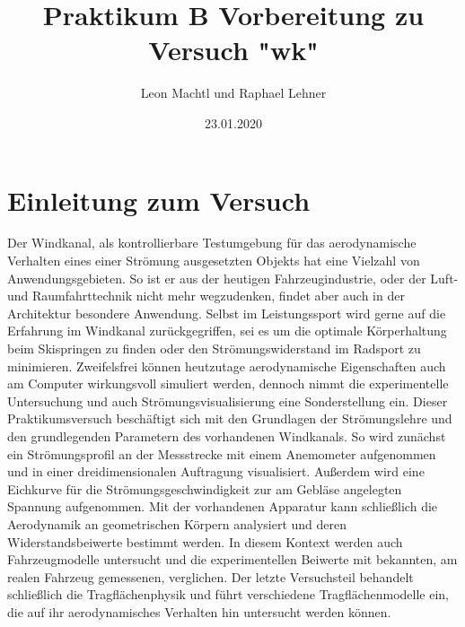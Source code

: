 \documentclass[a4paper,10pt]{scrartcl}
\title{Praktikum B Vorbereitung zu Versuch "wk"}
\author{Leon Machtl und Raphael Lehner}
\date{23.01.2020}
\begin{document}
	\maketitle
	\tableofcontents
	\newpage
	
	\section{Einleitung zum Versuch}
Der Windkanal, als kontrollierbare Testumgebung für das aerodynamische Verhalten eines einer Strömung ausgesetzten Objekts hat eine Vielzahl von Anwendungsgebieten. So ist er aus der heutigen
Fahrzeugindustrie, oder der Luft- und Raumfahrttechnik nicht mehr wegzudenken, findet aber auch
in der Architektur besondere Anwendung. Selbst im Leistungssport wird gerne auf die Erfahrung
im Windkanal zurückgegriffen, sei es um die optimale Körperhaltung beim Skispringen zu finden
oder den Strömungswiderstand im Radsport zu minimieren. Zweifelsfrei können heutzutage aerodynamische Eigenschaften auch am Computer wirkungsvoll simuliert werden, dennoch nimmt die
experimentelle Untersuchung und auch Strömungsvisualisierung eine Sonderstellung ein.
Dieser Praktikumsversuch beschäftigt sich mit den Grundlagen der Strömungslehre und den grundlegenden Parametern des vorhandenen Windkanals. So wird zunächst ein Strömungsprofil an der
Messstrecke mit einem Anemometer aufgenommen und in einer dreidimensionalen Auftragung visualisiert. Außerdem wird eine Eichkurve für die Strömungsgeschwindigkeit zur am Gebläse angelegten Spannung aufgenommen. Mit der vorhandenen Apparatur kann schließlich die Aerodynamik
an geometrischen Körpern analysiert und deren Widerstandsbeiwerte bestimmt werden. In diesem
Kontext werden auch Fahrzeugmodelle untersucht und die experimentellen Beiwerte mit bekannten,
am realen Fahrzeug gemessenen, verglichen. Der letzte Versuchsteil behandelt schließlich die Tragflächenphysik und führt verschiedene Tragflächenmodelle ein, die auf ihr aerodynamisches Verhalten
hin untersucht werden können.
\end{document}
